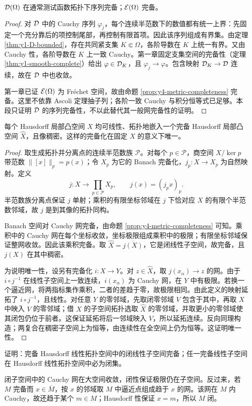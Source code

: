 \begin{proposition}[测试函数空间的序列完备性]
$\mathcal{D}(\Omega)$ 在通常测试函数拓扑下序列完备；$\mathcal{E}(\Omega)$ 完备。
\end{proposition}
\begin{proof}
对 $\mathcal{D}$ 中的 Cauchy 序列 $\varphi_j$，每个连续半范数下的数值都有统一上界：先固定一个充分靠后的项控制尾部，再控制有限首项。因此该序列组成有界集。由定理 \ref{thm:y1-D-bounded}，存在共同紧支集 $K\Subset\Omega$，各阶导数在 $K$ 上统一有界。又由 Cauchy 性，各阶导数在 $K$ 上一致 Cauchy。第一章固定支集空间的完备性（定理 \ref{thm:y1-smooth-complete}）给出 $\varphi\in\mathcal{D}_K$，且 $\varphi_j\to\varphi$。包含映射 $\mathcal{D}_K\to\mathcal{D}$ 连续，故在 $\mathcal{D}$ 中也收敛。

第一章已证 $\mathcal{E}(\Omega)$ 为 Fr\'echet 空间，故由命题 \ref{prop:y4-metric-completeness} 完备。这里不依靠 Ascoli 定理抽子列；各阶一致 Cauchy 与积分恒等式已足够。本段只证明 $\mathcal{D}$ 的序列完备性，不以此替代其一般网完备性的证明。
\end{proof}

\begin{theorem}[局部凸空间的完备化]\label{thm:y4-lcs-completion}
每个 Hausdorff 局部凸空间 $X$ 均可线性、拓扑地嵌入一个完备 Hausdorff 局部凸空间 $\widehat X$，且像稠密。这样的完备化在固定 $X$ 的意义下唯一。
\end{theorem}
\begin{proof}
取生成拓扑并分离点的连续半范数族 $\mathcal P$。对每个 $p\in\mathcal P$，商空间 $X/\ker p$ 带范数 $\|[x]\|_p=p(x)$；令 $X_p$ 为它的 Banach 完备化，$j_p:X\to X_p$ 为自然映射。定义
\[
 j:X\longrightarrow\prod_{p\in\mathcal P}X_p,\qquad j(x)=(j_px)_p.
\]
半范数族分离点保证 $j$ 单射；乘积的有限坐标邻域在 $j$ 下恰对应 $X$ 的有限个半范数邻域，故 $j$ 是到其像的拓扑同构。

Banach 空间对 Cauchy 网完备，由命题 \ref{prop:y4-metric-completeness} 可知。乘积中的 Cauchy 网在每个坐标收敛，坐标极限组成乘积中的极限；有限坐标邻域保证整网收敛。因此该乘积完备。取 $\widehat X=\overline{j(X)}$，它是闭线性子空间，故完备，且 $j(X)$ 在其中稠密。

为说明唯一性，设另有完备化 $i:X\to Y$。对 $z\in\widehat X$，取 $j(x_\alpha)\to z$ 的网。由于 $i\circ j^{-1}$ 在线性子空间上一致连续，$i(x_\alpha)$ 为 Cauchy 网，在 $Y$ 中有极限。若换一个逼近网，将两指标集作乘积，二者的差趋于零，故极限相同。由此定义的映射延拓了 $i\circ j^{-1}$，且线性。对任意 $Y$ 的零邻域，先取闭零邻域 $V$ 包含于其中，再取 $X$ 中映入 $V$ 的零邻域；借 $X$ 的子空间拓扑选取 $\widehat X$ 的零邻域，并取更小的零邻域使其闭包仍位于前者。这保证延拓将后一邻域映入 $V$，所以延拓连续。反向同理构造；两复合在稠密子空间上为恒等，由连续性在全空间上仍为恒等。这证明唯一性。
\end{proof}

\begin{exercise}
证明：完备 Hausdorff 线性拓扑空间中的闭线性子空间完备；任一完备线性子空间在 Hausdorff 线性拓扑空间中必为闭集。
\end{exercise}
\begin{solution}
闭子空间中的 Cauchy 网在大空间收敛，闭性保证极限仍在子空间。反过来，若 $M$ 完备而 $x\in\overline M$，按 $x$ 的邻域取 $M$ 中逼近点组成趋于 $x$ 的网。该网在 $M$ 内 Cauchy，故还趋于某个 $m\in M$；Hausdorff 性保证 $x=m$，所以 $M$ 闭。
\end{solution}
